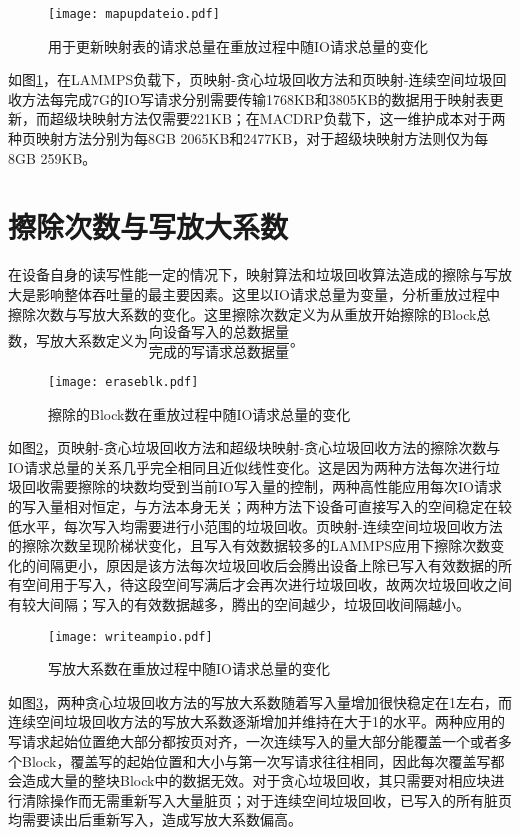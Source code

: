 \begin{figure}[H]
    \centering
    \texttt{[image: mapupdateio.pdf]}
    \caption{用于更新映射表的请求总量在重放过程中随IO请求总量的变化}
    \label{fig:res_mapupdate}
\end{figure}

如图\ref{fig:res_mapupdate}，在LAMMPS负载下，页映射-贪心垃圾回收方法和页映射-连续空间垃圾回收方法每完成7G的IO写请求分别需要传输1768KB和3805KB的数据用于映射表更新，而超级块映射方法仅需要221KB；在MACDRP负载下，这一维护成本对于两种页映射方法分别为每8GB 2065KB和2477KB，对于超级块映射方法则仅为每8GB 259KB。

\section{擦除次数与写放大系数}

在设备自身的读写性能一定的情况下，映射算法和垃圾回收算法造成的擦除与写放大是影响整体吞吐量的最主要因素。这里以IO请求总量为变量，分析重放过程中擦除次数与写放大系数的变化。这里擦除次数定义为从重放开始擦除的Block总数，写放大系数定义为$\dfrac{\text{向设备写入的总数据量}}{\text{完成的写请求总数据量}}$。

\begin{figure}[H]
    \centering
    \texttt{[image: eraseblk.pdf]}
    \caption{擦除的Block数在重放过程中随IO请求总量的变化}
    \label{fig:res_erasecount}
\end{figure}

如图\ref{fig:res_erasecount}，页映射-贪心垃圾回收方法和超级块映射-贪心垃圾回收方法的擦除次数与IO请求总量的关系几乎完全相同且近似线性变化。这是因为两种方法每次进行垃圾回收需要擦除的块数均受到当前IO写入量的控制，两种高性能应用每次IO请求的写入量相对恒定，与方法本身无关；两种方法下设备可直接写入的空间稳定在较低水平，每次写入均需要进行小范围的垃圾回收。页映射-连续空间垃圾回收方法的擦除次数呈现阶梯状变化，且写入有效数据较多的LAMMPS应用下擦除次数变化的间隔更小，原因是该方法每次垃圾回收后会腾出设备上除已写入有效数据的所有空间用于写入，待这段空间写满后才会再次进行垃圾回收，故两次垃圾回收之间有较大间隔；写入的有效数据越多，腾出的空间越少，垃圾回收间隔越小。

\begin{figure}[H]
    \centering
    \texttt{[image: writeampio.pdf]}
    \caption{写放大系数在重放过程中随IO请求总量的变化}
    \label{fig:res_writeamp}
\end{figure}

如图\ref{fig:res_writeamp}，两种贪心垃圾回收方法的写放大系数随着写入量增加很快稳定在1左右，而连续空间垃圾回收方法的写放大系数逐渐增加并维持在大于1的水平。两种应用的写请求起始位置绝大部分都按页对齐，一次连续写入的量大部分能覆盖一个或者多个Block，覆盖写的起始位置和大小与第一次写请求往往相同，因此每次覆盖写都会造成大量的整块Block中的数据无效。对于贪心垃圾回收，其只需要对相应块进行清除操作而无需重新写入大量脏页；对于连续空间垃圾回收，已写入的所有脏页均需要读出后重新写入，造成写放大系数偏高。

